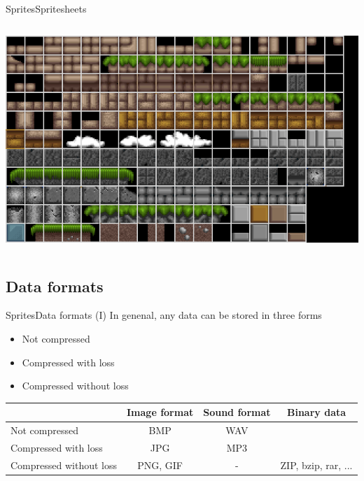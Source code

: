 \documentclass[10pt,compress]{beamer} %
\begin{document}
\begin{frame}{Sprites}{Spritesheets}
\begin{columns}
		\includegraphics[width=\linewidth]{figs/blocks1.png}
   \end{columns}
\end{frame}

\subsection{Data formats}

\begin{frame}{Sprites}{Data formats (I)}
    In genenal, any data can be stored in three forms
        \begin{itemize}
        \item Not compressed
        \item Compressed with loss
        \item Compressed without loss
	    \end{itemize}

    \begin{table}
    \centering
    \begin{tabular}{l|c|c|c}
                            & Image format & Sound format & Binary data\\\hline
    Not compressed          & BMP          & WAV  &  \\
    Compressed with loss    & JPG          & MP3  &  \\
    Compressed without loss & PNG, GIF     & -    & ZIP, bzip, rar, ... 
    \end{tabular}
    \end{table}
\end{frame}
\end{document}
